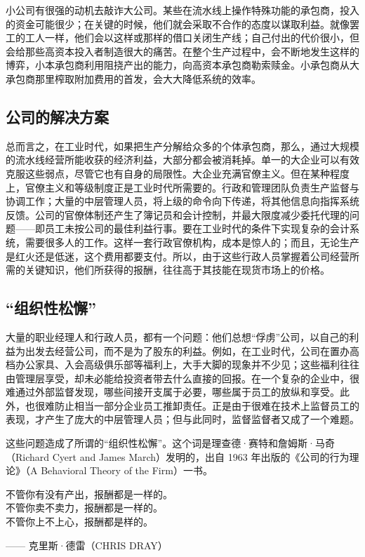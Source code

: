 小公司有很强的动机去敲诈大公司。某些在流水线上操作特殊功能的承包商，投入的资金可能很少；在关键的时候，他们就会采取不合作的态度以谋取利益。就像罢工的工人一样，他们会以这样或那样的借口关闭生产线；自己付出的代价很小，但会给那些高资本投入者制造很大的痛苦。在整个生产过程中，会不断地发生这样的博弈，小本承包商利用阻挠产出的能力，向高资本承包商勒索赎金。小承包商从大承包商那里榨取附加费用的首发，会大大降低系统的效率。

\subsection{公司的解决方案}
总而言之，在工业时代，如果把生产分解给众多的个体承包商，那么，通过大规模的流水线经营所能收获的经济利益，大部分都会被消耗掉。单一的大企业可以有效克服这些弱点，尽管它也有自身的局限性。大企业充满官僚主义。但在某种程度上，官僚主义和等级制度正是工业时代所需要的。行政和管理团队负责生产监督与协调工作；大量的中层管理人员，将上级的命令向下传递，将其他信息向指挥系统反馈。公司的官僚体制还产生了簿记员和会计控制，并最大限度减少委托代理的问题——即员工未按公司的最佳利益行事。要在工业时代的条件下实现复杂的会计系统，需要很多人的工作。这样一套行政官僚机构，成本是惊人的；而且，无论生产是红火还是低迷，这个费用都要支付。所以，由于这些行政人员掌握着公司经营所需的关键知识，他们所获得的报酬，往往高于其技能在现货市场上的价格。

\subsection{“组织性松懈”}
大量的职业经理人和行政人员，都有一个问题：他们总想“俘虏”公司，以自己的利益为出发去经营公司，而不是为了股东的利益。例如，在工业时代，公司在置办高档办公家具、入会高级俱乐部等福利上，大手大脚的现象并不少见；这些福利往往由管理层享受，却未必能给投资者带去什么直接的回报。在一个复杂的企业中，很难通过外部监督发现，哪些间接开支属于必要，哪些属于员工的放纵和享受。此外，也很难防止相当一部分企业员工推卸责任。正是由于很难在技术上监督员工的表现，才产生了庞大的中层管理人员；但与此同时，监督监督者又成了一个难题。

这些问题造成了所谓的“组织性松懈”。这个词是理查德·赛特和詹姆斯·马奇（Richard Cyert and James March）发明的，出自 1963 年出版的《公司的行为理论》（A Behavioral Theory of the Firm）一书。

\begin{tcolorbox}
不管你有没有产出，报酬都是一样的。\\
不管你卖不卖力，报酬都是一样的。\\
不管你上不上心，报酬都是样的。
\begin{flushright}
—— 克里斯·德雷（CHRIS DRAY）
\end{flushright} 
\end{tcolorbox}

